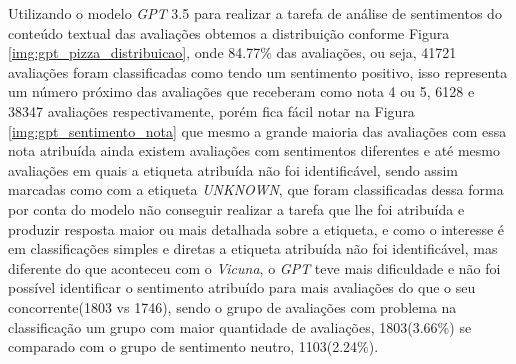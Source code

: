 Utilizando o modelo \textit{GPT} 3.5 para realizar a tarefa de análise de sentimentos do conteúdo textual das avaliações obtemos a distribuição conforme Figura \ref{img:gpt_pizza_distribuicao}, onde 84.77\% das avaliações, ou seja, 41721 avaliações foram classificadas como tendo um sentimento positivo, isso representa um número próximo das avaliações que receberam como nota 4 ou 5, 6128 e 38347 avaliações respectivamente, porém fica fácil notar na Figura \ref{img:gpt_sentimento_nota} que mesmo a grande maioria das avaliações com essa nota atribuída ainda existem avaliações com sentimentos diferentes e até mesmo avaliações em quais a etiqueta atribuída não foi identificável, sendo assim marcadas como com a etiqueta \textit{UNKNOWN}, que foram classificadas dessa forma por conta do modelo não conseguir realizar a tarefa que lhe foi atribuída e produzir resposta maior ou mais detalhada sobre a etiqueta, e como o interesse é em classificações simples e diretas a etiqueta atribuída não foi identificável, mas diferente do que aconteceu com o \textit{Vicuna}, o \textit{GPT} teve mais dificuldade e não foi possível identificar o sentimento atribuído para mais avaliações do que o seu concorrente(1803 vs 1746), sendo o grupo de avaliações com problema na classificação um grupo com maior quantidade de avaliações, 1803(3.66\%) se comparado com o grupo de sentimento neutro, 1103(2.24\%).

